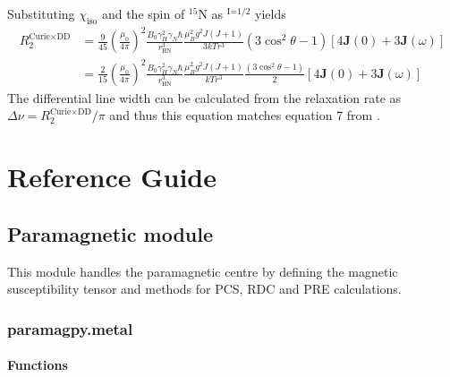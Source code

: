 \documentclass[a4paper,10pt,english,openany,oneside]{sphinxmanual}
\begin{document}
\sphinxAtStartPar
Substituting \(\chi_\text{iso}\) and the spin of $^{\text{15}}$N as $^{\text{I=1/2}}$ yields
\begin{equation*}
\begin{split}R_2^\text{Curie$\times$DD}&=\frac{9}{45} \left(\frac{\mu_0}{4\pi}\right)^2 \frac{B_0\gamma_H^2\gamma_N\hbar}{r_\text{HN}^3} \frac{\mu_B^2g^2J(J+1)}{3 k T r^3}(3\cos^2{\theta}-1)\left[4\mathbf{J}(0) + 3\mathbf{J}(\omega)\right]\\
&=\frac{2}{15} \left(\frac{\mu_0}{4\pi}\right)^2 \frac{B_0\gamma_H^2\gamma_N\hbar}{r_\text{HN}^3} \frac{\mu_B^2g^2J(J+1)}{k T r^3}\frac{(3\cos^2{\theta}-1)}{2}\left[4\mathbf{J}(0) + 3\mathbf{J}(\omega)\right]\end{split}
\end{equation*}
\sphinxAtStartPar
The differential line width can be calculated from the relaxation rate as \(\Delta\nu = R_2^\text{Curie$\times$DD}/\pi\) and thus this equation matches equation 7 from .


\section{Reference Guide}
\label{\detokenize{reference/index:reference-guide}}\label{\detokenize{reference/index:reference-index}}\label{\detokenize{reference/index::doc}}

\subsection{Paramagnetic module}
\label{\detokenize{reference/index:paramagnetic-module}}
\sphinxAtStartPar
This module handles the paramagnetic centre by defining the magnetic susceptibility
tensor and methods for PCS, RDC and PRE calculations.


\subsubsection{paramagpy.metal}
\label{\detokenize{reference/metal:module-paramagpy.metal}}\label{\detokenize{reference/metal:paramagpy-metal}}\label{\detokenize{reference/metal:metal}}\label{\detokenize{reference/metal::doc}}

\paragraph{Functions}
\label{\detokenize{reference/metal:functions}}
\end{document}
